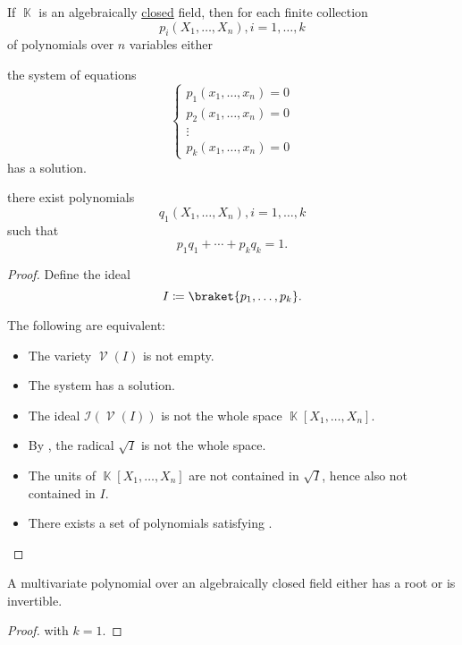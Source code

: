 \begin{corollary}\label{thm:weak_nullstellensatz}
  If \( \BbbK \) is an algebraically \hyperref[def:algebraically_closed_field]{closed} field, then for each finite collection
  \begin{equation*}
    p_i(X_1, \ldots, X_n), i = 1, \ldots, k
  \end{equation*}
  of polynomials over \( n \) variables either
  \begin{thmenum}
     the system of equations
    \begin{equation}\label{thm:weak_nullstellensatz/system}
      \begin{cases}
        p_1(x_1, \ldots, x_n) = 0 \\
        p_2(x_1, \ldots, x_n) = 0 \\
        \vdots                    \\
        p_k(x_1, \ldots, x_n) = 0
      \end{cases}
    \end{equation}
    has a solution.

     there exist polynomials
    \begin{equation*}
      q_1(X_1, \ldots, X_n), i = 1, \ldots, k
    \end{equation*}
    such that
    \begin{equation*}
      p_1 q_1 + \cdots + p_k q_k = 1.
    \end{equation*}
  \end{thmenum}
\end{corollary}
\begin{proof}
  Define the ideal
  \begin{equation*}
    I \coloneqq \braket{p_1, \ldots, p_k}.
  \end{equation*}

  The following are equivalent:
  \begin{itemize}
    \item The variety \( \mscrV(I) \) is not empty.
    \item The system  has a solution.
    \item The ideal \( \mathcal{I}(\mscrV(I)) \) is not the whole space \( \BbbK[X_1, \ldots, X_n] \).
    \item By , the radical \( \sqrt I \) is not the whole space.
    \item The units of \( \BbbK[X_1, \ldots, X_n] \) are not contained in \( \sqrt I \), hence also not contained in \( I \).
    \item There exists a set of polynomials satisfying .
  \end{itemize}
\end{proof}

\begin{corollary}\label{thm:polynomial_over_closed_field_is_either_invertible_or_has_root}
  A multivariate polynomial over an algebraically closed field either has a root or is invertible.
\end{corollary}
\begin{proof}
   with \( k = 1 \).
\end{proof}
